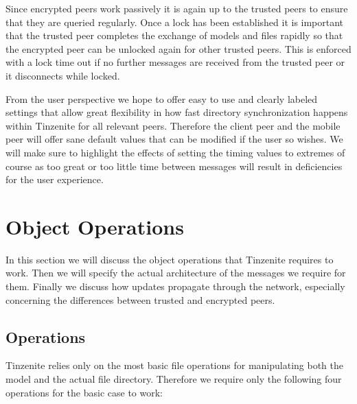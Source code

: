 Since encrypted peers work passively it is again up to the trusted peers to ensure that they are queried regularly.
Once a lock has been established it is important that the trusted peer completes the exchange of models and files rapidly so that the encrypted peer can be unlocked again for other trusted peers.
This is enforced with a lock time out if no further messages are received from the trusted peer or it disconnects while locked.

From the user perspective we hope to offer easy to use and clearly labeled settings that allow great flexibility in how fast directory synchronization happens within Tinzenite for all relevant peers.
Therefore the client peer and the mobile peer will offer sane default values that can be modified if the user so wishes.
We will make sure to highlight the effects of setting the timing values to extremes of course as too great or too little time between messages will result in deficiencies for the user experience.

\section{Object Operations}
\label{sec:Object Operations}

In this section we will discuss the object operations that Tinzenite requires to work.
Then we will specify the actual architecture of the messages we require for them.
Finally we discuss how updates propagate through the network, especially concerning the differences between trusted and encrypted peers.

\subsection{Operations}
\label{sub:Operations}

Tinzenite relies only on the most basic file operations for manipulating both the model and the actual file directory.
Therefore we require only the following four operations for the basic case to work:

